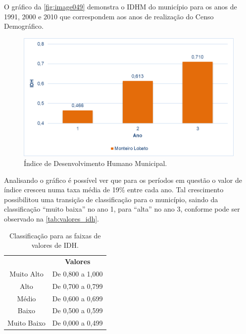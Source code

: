 O gráfico da \autoref{fig:image049} demonstra o IDHM do município para os anos de 1991, 2000 e 2010 que correspondem aos anos de realização do Censo Demográfico.
 
  \begin{figure}[h!]
 	\centering
 	\includegraphics[width=0.8\linewidth]{produtos/proddois/image049}
 	\caption{Índice de Desenvolvimento Humano Municipal.}
 	\label{fig:image049}
 \end{figure}


Analisando o gráfico é possível ver que para os períodos em questão o valor de índice cresceu numa taxa média de 19\% entre cada ano. Tal crescimento possibilitou uma transição de classificação para o município, saindo da classificação “muito baixa” no ano 1, para “alta” no ano 3, conforme pode ser observado na  \autoref{tab:valores_idh}.

\begin{center}
	\begin{table}[htbp]
	\centering
	\caption{Classificação para as faixas de valores de IDH.}
	\begin{tabular}{c|c}
		\rowcolor[rgb]{ .969,  .588,  .275} \multicolumn{1}{c}{\textcolor[rgb]{ 1,  1,  1}{\textbf{Faixas}}} & \textcolor[rgb]{ 1,  1,  1}{\textbf{Valores}} \\
		\rowcolor[rgb]{ .992,  .914,  .851} Muito Alto & De 0,800 a 1,000 \\
		\rowcolor[rgb]{ .984,  .831,  .706} Alto  & De 0,700 a 0,799 \\
		\rowcolor[rgb]{ .992,  .914,  .851} Médio & De 0,600 a 0,699 \\
		\rowcolor[rgb]{ .984,  .831,  .706} Baixo & De 0,500 a 0,599 \\
		\rowcolor[rgb]{ .992,  .914,  .851} Muito Baixo & De 0,000 a 0,499 \\
	\end{tabular}%
	\label{tab:valores_idh}%
\end{table}%
\end{center}

